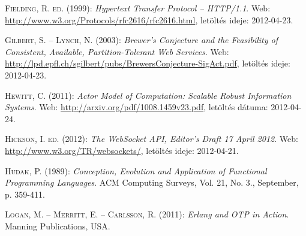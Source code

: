 \documentclass[12pt, a4paper, oneside]{book}
\begin{document}
\begin{thebibliography}{9}
{\scshape Fielding, R. ed.} (1999): \emph{Hypertext Transfer Protocol --
HTTP/1.1}. Web: \url{http://www.w3.org/Protocols/rfc2616/rfc2616.html},
letöltés ideje: 2012-04-23.

{\scshape Gilbert, S. -- Lynch, N.} (2003): \emph{Brewer’s Conjecture and the
Feasibility of Consistent, Available, Partition-Tolerant Web Services}. Web:
\url{http://lpd.epfl.ch/sgilbert/pubs/BrewersConjecture-SigAct.pdf}, letöltés
ideje: 2012-04-23.

{\scshape Hewitt, C.} (2011): \emph{Actor Model of Computation: Scalable Robust
Information Systems}. Web: \url{http://arxiv.org/pdf/1008.1459v23.pdf},
letöltés dátuma: 2012-04-24.

{\scshape Hickson, I. ed.} (2012): \emph{The WebSocket API, Editor's Draft 17
April 2012}. Web: \url{http://www.w3.org/TR/websockets/}, letöltés ideje:
2012-04-21.

{\scshape Hudak, P.} (1989): \emph{Conception, Evolution and Application of Functional
Programming Languages}. ACM Computing Surveys, Vol. 21, No. 3., September, p.
359-411.

{\scshape Logan, M. -- Merritt, E. -- Carlsson, R.} (2011): \emph{Erlang and OTP in Action}.
Manning Publications, USA.

\end{thebibliography}

\clearpage
{}
\printindex
\end{document}
